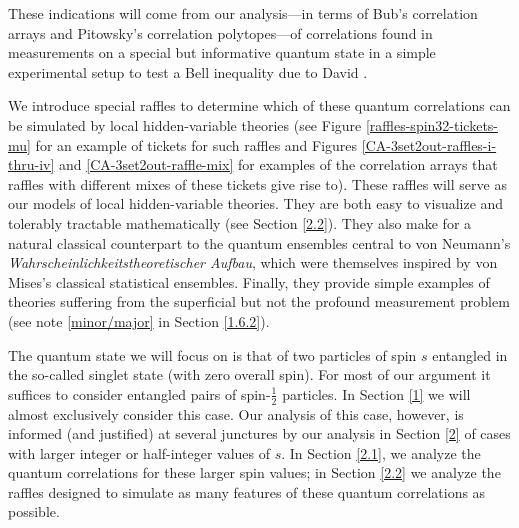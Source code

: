 These indications will come from our analysis---in terms of Bub's correlation arrays and Pitowsky's correlation polytopes---of correlations found in measurements on a special but informative quantum state in a simple experimental setup to test a Bell inequality due to David \citet[see Figure \ref{CA-3set2out-Mermin} for the correlation array for Mermin's example of a violation of this inequality]{Mermin 1981, Mermin 1988}. 

We introduce special raffles to determine which of these quantum correlations can be simulated by local hidden-variable theories (see Figure \ref{raffles-spin32-tickets-mu} for an example of tickets for such raffles and Figures \ref{CA-3set2out-raffles-i-thru-iv} and \ref{CA-3set2out-raffle-mix} for examples of the correlation arrays that raffles with different mixes of these tickets give rise to). These raffles will serve as our models of local hidden-variable theories. They are both easy to visualize and tolerably tractable mathematically (see Section \ref{2.2}). They also make for a natural classical counterpart to the quantum ensembles central to von Neumann's \emph{Wahrscheinlichkeitstheoretischer Aufbau}, which were themselves inspired by von Mises's classical statistical ensembles. Finally, they provide simple examples of theories suffering from the superficial but not the profound measurement problem (see note \ref{minor/major} in Section \ref{1.6.2}). 

The quantum state we will focus on is that of two particles of spin $s$ entangled in the so-called singlet state (with zero overall spin). For most of our argument it suffices to consider entangled pairs of spin-$\frac12$ particles. In Section \ref{1} we will almost exclusively consider this case. Our analysis of this case, however, is informed (and justified) at several junctures by our analysis in Section \ref{2} of cases with larger integer or half-integer values of $s$. In Section \ref{2.1}, we analyze the quantum correlations for these larger spin values; in Section \ref{2.2} we analyze the raffles designed to simulate as many features of these quantum correlations as possible. 

